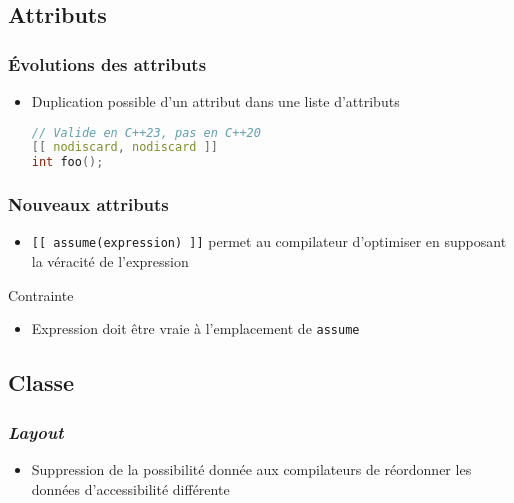 \documentclass[C++.tex]{subfiles}
\begin{document}
\subsection*{Attributs}
\begin{frame}[fragile]
	\frametitle{Évolutions des attributs}
	\begin{itemize}
		\item Duplication possible d'un attribut dans une liste d'attributs

		\begin{lstlisting}[language=C++]
// Valide en C++23, pas en C++20
[[ nodiscard, nodiscard ]]
int foo();\end{lstlisting}
	\end{itemize}
\end{frame}

\begin{frame}[fragile]
	\frametitle{Nouveaux attributs}
	\begin{itemize}
		\item \lstinline|[[ assume(expression) ]]| permet au compilateur d'optimiser en supposant la véracité de l'expression
	\end{itemize}

	\begin{alertblock}{Contrainte}
		\begin{itemize}
			\item Expression doit être vraie à l'emplacement de \lstinline|assume|

		\end{itemize}
	\end{alertblock}
\end{frame}

\subsection*{Classe}
\begin{frame}[fragile]
	\frametitle{\textit{Layout}}
	\begin{itemize}
		\item Suppression de la possibilité donnée aux compilateurs de réordonner les données d'accessibilité différente
	\end{itemize}
\end{frame}
\end{document}
